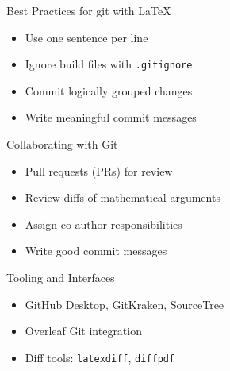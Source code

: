 \documentclass[12pt,t]{beamer}
\begin{document}

\begin{frame}{Best Practices for git with \LaTeX}
\begin{itemize}
    \item Use one sentence per line
		\pause
		\vspace{1em}
    \item Ignore build files with \texttt{.gitignore}
		\pause
		\vspace{1em}
    \item Commit logically grouped changes
		\pause
		\vspace{1em}
    \item Write meaningful commit messages
\end{itemize}
\end{frame}

\begin{frame}{Collaborating with Git}
\begin{itemize}
    \item Pull requests (PRs) for review
		\vspace{1em}
		\pause
    \item Review diffs of mathematical arguments
		\vspace{1em}
		\pause
    \item Assign co-author responsibilities
		\vspace{1em}
		\pause
    \item Write good commit messages
\end{itemize}
\end{frame}

\begin{frame}{Tooling and Interfaces}
\begin{itemize}
    \item GitHub Desktop, GitKraken, SourceTree
		\vspace{1em}
		\pause
    \item Overleaf Git integration
		\vspace{1em}
		\pause
    \item Diff tools: \texttt{latexdiff}, \texttt{diffpdf}
\end{itemize}
\end{frame}
\end{document}
